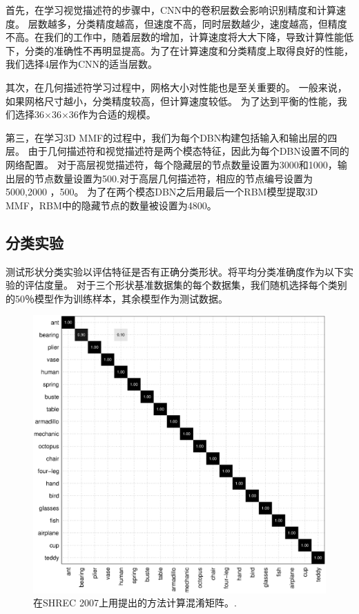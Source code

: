 首先，在学习视觉描述符的步骤中，CNN中的卷积层数会影响识别精度和计算速度。 层数越多，分类精度越高，但速度不高，同时层数越少，速度越高，但精度不高。在我们的工作中，随着层数的增加，计算速度将大大下降，导致计算性能低下，分类的准确性不再明显提高。为了在计算速度和分类精度上取得良好的性能，我们选择4层作为CNN的适当层数。

其次，在几何描述符学习过程中，网格大小对性能也是至关重要的。 一般来说，如果网格尺寸越小，分类精度较高，但计算速度较低。 为了达到平衡的性能，我们选择36$\times$36$\times$36作为合适的规模。

第三，在学习3D MMF的过程中，我们为每个DBN构建包括输入和输出层的四层。 由于几何描述符和视觉描述符是两个模态特征，因此为每个DBN设置不同的网络配置。 对于高层视觉描述符，每个隐藏层的节点数量设置为3000和1000，输出层的节点数量设置为500.对于高层几何描述符，相应的节点编号设置为5000,2000 ，500。 为了在两个模态DBN之后用最后一个RBM模型提取3D MMF，RBM中的隐藏节点的数量被设置为4800。

\subsection{分类实验}

测试形状分类实验以评估特征是否有正确分类形状。将平均分类准确度作为以下实验的评估度量。 对于三个形状基准数据集的每个数据集，我们随机选择每个类别的50％模型作为训练样本，其余模型作为测试数据。

\begin{figure}[hptb]
\begin{center}
\includegraphics[width=0.98\linewidth]{figures/CM2007} 
\end{center} 
\vspace{-4mm}
\caption{在SHREC 2007上用提出的方法计算混淆矩阵。.} \label{fig_cm_shrec2007}
\end{figure}

